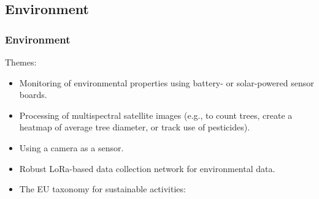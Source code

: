 \subsection{Environment}
\begin{frame}
  \frametitle{Environment}
  \vspace{3mm}
  Themes:
  \begin{itemize}
    \item Monitoring of environmental properties using battery- or solar-powered sensor boards.
    \item Processing of multispectral satellite images (e.g., to count trees, create a heatmap of average tree diameter, or track use of pesticides).
    \item Using a camera as a sensor.
    \item Robust LoRa-based data collection network for environmental data.
    \item The EU taxonomy for sustainable activities:
      \\
  \end{itemize}
\end{frame}

